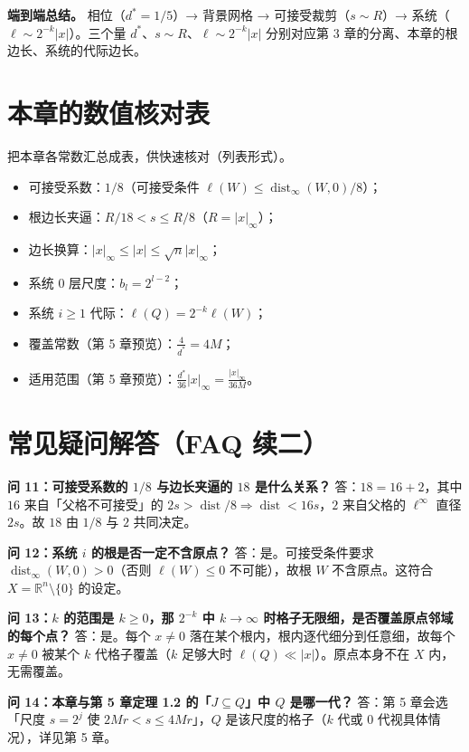 \documentclass[a4paper,11pt,openany]{ctexbook}
\numberwithin{equation}{chapter}
\numberwithin{figure}{chapter}
\numberwithin{table}{chapter}
\begin{document}
\textbf{端到端总结。} 相位（$d^*=1/5$）→ 背景网格 → 可接受裁剪（$s\sim R$）→ 系统（$\ell\sim2^{-k}|x|$）。三个量 $d^*$、$s\sim R$、$\ell\sim2^{-k}|x|$ 分别对应第 3 章的分离、本章的根边长、系统的代际边长。

\section{本章的数值核对表}

把本章各常数汇总成表，供快速核对（列表形式）。

\begin{itemize}
\item 可接受系数：$1/8$（可接受条件 $\ell(W)\le\operatorname{dist}_\infty(W,0)/8$）；
\item 根边长夹逼：$R/18<s\le R/8$（$R=|x|_\infty$）；
\item 边长换算：$|x|_\infty\le|x|\le\sqrt n|x|_\infty$；
\item 系统 0 层尺度：$b_l=2^{l-2}$；
\item 系统 $i\ge1$ 代际：$\ell(Q)=2^{-k}\ell(W)$；
\item 覆盖常数（第 5 章预览）：$\frac4{d^*}=4M$；
\item 适用范围（第 5 章预览）：$\frac{d^*}{36}|x|_\infty=\frac{|x|_\infty}{36M}$。
\end{itemize}

\section{常见疑问解答（FAQ 续二）}

\textbf{问 11：可接受系数的 $1/8$ 与边长夹逼的 $18$ 是什么关系？} 答：$18=16+2$，其中 $16$ 来自「父格不可接受」的 $2s>\operatorname{dist}/8\Rightarrow\operatorname{dist}<16s$，$2$ 来自父格的 $\ell^\infty$ 直径 $2s$。故 $18$ 由 $1/8$ 与 $2$ 共同决定。

\textbf{问 12：系统 $i$ 的根是否一定不含原点？} 答：是。可接受条件要求 $\operatorname{dist}_\infty(W,0)>0$（否则 $\ell(W)\le0$ 不可能），故根 $W$ 不含原点。这符合 $X=\mathbb R^n\setminus\{0\}$ 的设定。

\textbf{问 13：$k$ 的范围是 $k\ge0$，那 $2^{-k}$ 中 $k\to\infty$ 时格子无限细，是否覆盖原点邻域的每个点？} 答：是。每个 $x\neq0$ 落在某个根内，根内逐代细分到任意细，故每个 $x\neq0$ 被某个 $k$ 代格子覆盖（$k$ 足够大时 $\ell(Q)\ll|x|$）。原点本身不在 $X$ 内，无需覆盖。

\textbf{问 14：本章与第 5 章定理 1.2 的「$J\subseteq Q$」中 $Q$ 是哪一代？} 答：第 5 章会选「尺度 $s=2^j$ 使 $2Mr<s\le4Mr$」，$Q$ 是该尺度的格子（$k$ 代或 $0$ 代视具体情况），详见第 5 章。
\end{document}
